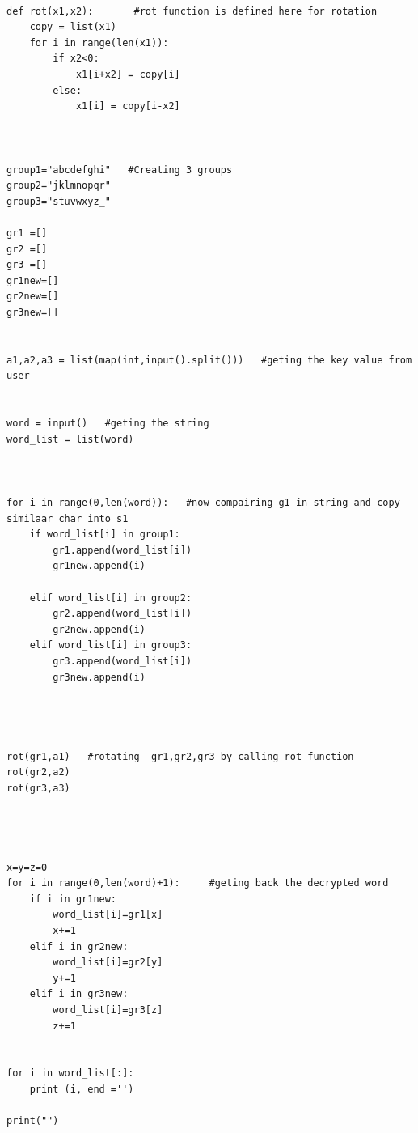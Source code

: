 \documentclass[12pt]{article}
\begin{document}
			\begin{verbatim}
			
def rot(x1,x2):       #rot function is defined here for rotation
    copy = list(x1)
    for i in range(len(x1)):
        if x2<0:
            x1[i+x2] = copy[i]
        else:
            x1[i] = copy[i-x2]



group1="abcdefghi"   #Creating 3 groups
group2="jklmnopqr"
group3="stuvwxyz_"

gr1 =[]
gr2 =[]
gr3 =[]
gr1new=[]
gr2new=[]
gr3new=[]


a1,a2,a3 = list(map(int,input().split()))   #geting the key value from user


word = input()   #geting the string
word_list = list(word)



for i in range(0,len(word)):   #now compairing g1 in string and copy similaar char into s1
	if word_list[i] in group1:
		gr1.append(word_list[i])
		gr1new.append(i)
		
	elif word_list[i] in group2:
	    gr2.append(word_list[i])
	    gr2new.append(i)
	elif word_list[i] in group3:
	    gr3.append(word_list[i]) 
	    gr3new.append(i)




rot(gr1,a1)   #rotating  gr1,gr2,gr3 by calling rot function
rot(gr2,a2)
rot(gr3,a3)




x=y=z=0
for i in range(0,len(word)+1):     #geting back the decrypted word
	if i in gr1new:
		word_list[i]=gr1[x]
		x+=1
	elif i in gr2new:
		word_list[i]=gr2[y]
		y+=1
	elif i in gr3new:
		word_list[i]=gr3[z]
		z+=1	


for i in word_list[:]:
	print (i, end ='')

print("")
			\end{verbatim}
		
		
		
\end{document}
